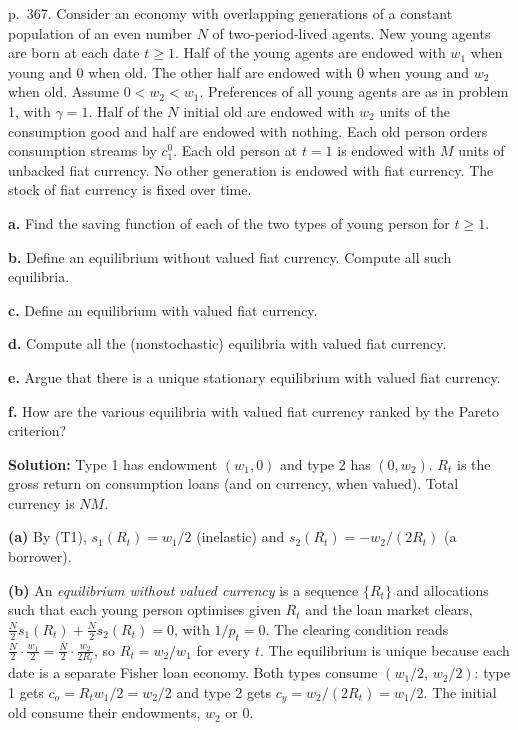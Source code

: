 \documentclass[12pt, letterpaper]{article}
\begin{document}
\begin{tcolorbox}[evenbox,title={Exercise 9.2 \quad Lenders and borrowers in one generation}]
\begin{tcolorbox}[questionbox]
p.~367. Consider an economy with overlapping generations of a constant population of an even number
$N$ of two-period-lived agents. New young agents are born at each date $t\ge1$. Half of the young
agents are endowed with $w_1$ when young and $0$ when old. The other half are endowed with $0$ when
young and $w_2$ when old. Assume $0<w_2<w_1$. Preferences of all young agents are as in problem 1,
with $\gamma=1$. Half of the $N$ initial old are endowed with $w_2$ units of the consumption good and
half are endowed with nothing. Each old person orders consumption streams by $c_1^0$. Each old person
at $t=1$ is endowed with $M$ units of unbacked fiat currency. No other generation is endowed with
fiat currency. The stock of fiat currency is fixed over time.

\textbf{a.} Find the saving function of each of the two types of young person for $t\ge1$.

\textbf{b.} Define an equilibrium without valued fiat currency. Compute all such equilibria.

\textbf{c.} Define an equilibrium with valued fiat currency.

\textbf{d.} Compute all the (nonstochastic) equilibria with valued fiat currency.

\textbf{e.} Argue that there is a unique stationary equilibrium with valued fiat currency.

\textbf{f.} How are the various equilibria with valued fiat currency ranked by the Pareto criterion?
\end{tcolorbox}

\textbf{Solution:} Type 1 has endowment $(w_1,0)$ and type 2 has $(0,w_2)$. $R_t$ is the gross return
on consumption loans (and on currency, when valued). Total currency is $NM$.

\textbf{(a)} By (T1), $s_1(R_t)=w_1/2$ (inelastic) and $s_2(R_t)=-w_2/(2R_t)$ (a borrower).

\textbf{(b)} An \emph{equilibrium without valued currency} is a sequence $\{R_t\}$ and allocations such
that each young person optimises given $R_t$ and the loan market clears,
$\frac N2s_1(R_t)+\frac N2s_2(R_t)=0$, with $1/p_t=0$. The clearing condition reads
$\frac N2\cdot\frac{w_1}2=\frac N2\cdot\frac{w_2}{2R_t}$, so $\boxed{R_t=w_2/w_1}$ for every $t$. The
equilibrium is unique because each date is a separate Fisher loan economy. Both types consume
$(w_1/2,\,w_2/2)$: type 1 gets $c_o=R_tw_1/2=w_2/2$ and type 2 gets $c_y=w_2/(2R_t)=w_1/2$. The
initial old consume their endowments, $w_2$ or $0$.


\end{tcolorbox}
\end{document}
